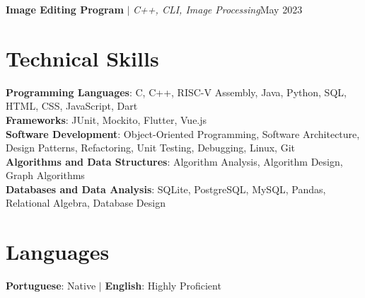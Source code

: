 \begin{resumeSubHeadingList}
  \resumeProjectHeading%
  {{\textbf{Image Editing Program} \href{https://github.com/peucastro/prog_project}{\faLink}} $|$ \emph{C++, CLI, Image Processing}}{May 2023}
  \begin{resumeItemList}
  \end{resumeItemList}

\end{resumeSubHeadingList}

\section{Technical Skills}
\begin{itemize}[leftmargin=0.15in, label={}]
    \small{
    \item{
        \textbf{Programming Languages}{: C, C++, RISC-V Assembly, Java, Python, SQL, HTML, CSS, JavaScript, Dart} \\
        \textbf{Frameworks}{: JUnit, Mockito, Flutter, Vue.js} \\
        \textbf{Software Development}{: Object-Oriented Programming, Software Architecture, Design Patterns, Refactoring, Unit Testing, Debugging, Linux, Git} \\
        \textbf{Algorithms and Data Structures}{: Algorithm Analysis, Algorithm Design, Graph Algorithms} \\
        \textbf{Databases and Data Analysis}{: SQLite, PostgreSQL, MySQL, Pandas, Relational Algebra, Database Design}
    }}
\end{itemize}

\section{Languages}
\begin{itemize}[leftmargin=0.15in, label={}]
    \small{
    \item{
        \textbf{Portuguese}{: Native} $|$
        \textbf{English}{: Highly Proficient}
    }}
\end{itemize}


